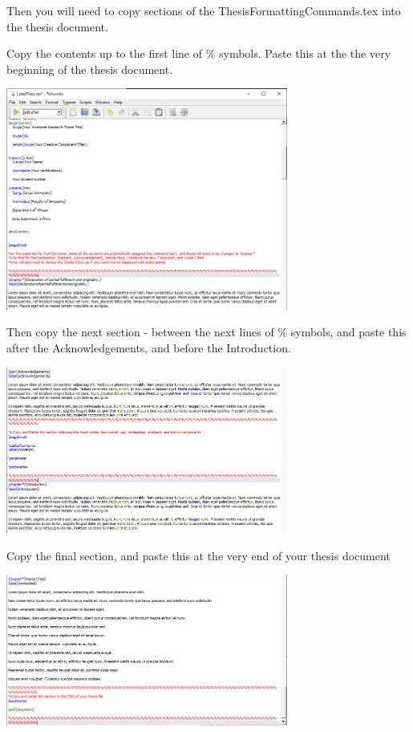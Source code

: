 \documentclass{article}
\begin{document}
Then you will need to copy sections of the ThesisFormattingCommands.tex into the thesis document. 

Copy the contents up to the first line of \% symbols. Paste this at the the very beginning of the thesis document. 

\includegraphics[width=350px]{images/tex006.PNG}

Then copy the next section - between the next lines of \% symbols, and paste this after the Acknowledgements, and before the Introduction. 

\includegraphics[width=350px]{images/tex007.PNG}

Copy the final section, and paste this at the very end of your thesis document

\includegraphics[width=350px]{images/tex008.PNG}
\end{document}
